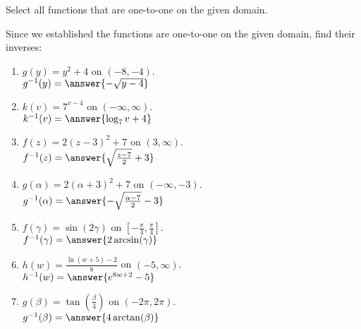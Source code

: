 \documentclass{ximera}
\author{Elizabeth Campolongo}
\begin{document}
\begin{exercise}
Select all functions that are one-to-one on the given domain.
%
\begin{selectAll}
\end{selectAll}

\begin{exercise}
Since we established the functions are one-to-one on the given domain, find their inverses:
\begin{enumerate}

\item $g(y) = y^2+4$ on $(-8,-4)$.\\
$g^{-1}(y) = \answer{-\sqrt{y-4}}$

\item $k(v) = 7^{v-4}$ on $(-\infty, \infty)$.\\
$k^{-1}(v) = \answer{\log_7v +4}$

\item $f(z) = 2(z-3)^2+7$ on $(3, \infty)$.\\
$f^{-1}(z) = \answer{\sqrt{\frac{z-7}{2}}+3}$

\item $g(\alpha) = 2(\alpha+3)^2+7$ on $(-\infty, -3)$.\\
$g^{-1}(\alpha) = \answer{-\sqrt{\frac{\alpha-7}{2}}-3}$

\item $f(\gamma) = \sin(2\gamma)$ on $\left[-\frac{\pi}{4}, \frac{\pi}{4} \right]$. \\
$f^{-1}(\gamma) = \answer{2\arcsin(\gamma)}$

\item $h(w) = \frac{\ln(w+5) - 2}{8}$ on $(-5,\infty)$. \\
$h^{-1}(w) = \answer{e^{8w+2}-5}$

\item $g(\beta)= \tan\left(\frac{\beta}{4}\right)$ on $(-2\pi,2\pi)$.\\
$g^{-1}(\beta) = \answer{4\arctan(\beta)}$

\end{enumerate}
\end{exercise}



\end{exercise}
\end{document}
